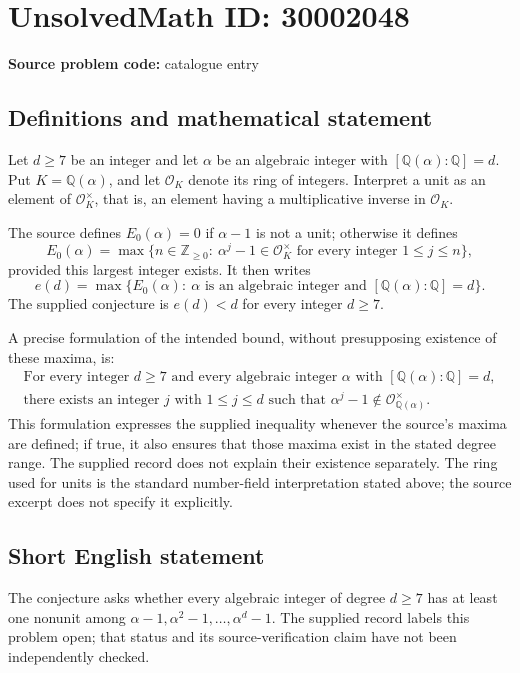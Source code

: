 \documentclass[11pt]{article}
\newcommand{\Z}{\mathbb{Z}}
\newcommand{\Q}{\mathbb{Q}}
\begin{document}
\section*{UnsolvedMath ID: 30002048}
\textbf{Source problem code:} catalogue entry
\subsection{Definitions and mathematical statement}
Let \(d\geq 7\) be an integer and let \(\alpha\) be an algebraic integer with \([\Q(\alpha):\Q]=d\). Put \(K=\Q(\alpha)\), and let \(\mathcal O_K\) denote its ring of integers. Interpret a unit as an element of \(\mathcal O_K^{\times}\), that is, an element having a multiplicative inverse in \(\mathcal O_K\).

The source defines \(E_0(\alpha)=0\) if \(\alpha-1\) is not a unit; otherwise it defines
\[
E_0(\alpha)=\max\bigl\{n\in\Z_{\geq 0}:\ \alpha^j-1\in\mathcal O_K^{\times}\text{ for every integer }1\leq j\leq n\bigr\},
\]
provided this largest integer exists. It then writes
\[
e(d)=\max\bigl\{E_0(\alpha):\ \alpha\text{ is an algebraic integer and }[\Q(\alpha):\Q]=d\bigr\}.
\]
The supplied conjecture is \(e(d)<d\) for every integer \(d\geq 7\).

A precise formulation of the intended bound, without presupposing existence of these maxima, is:
\[
\begin{gathered}
\text{For every integer }d\geq 7\text{ and every algebraic integer }\alpha
\text{ with }[\Q(\alpha):\Q]=d,\\
\text{there exists an integer }j\text{ with }1\leq j\leq d
\text{ such that }\alpha^j-1\notin\mathcal O_{\Q(\alpha)}^{\times}.
\end{gathered}
\]
This formulation expresses the supplied inequality whenever the source's maxima are defined; if true, it also ensures that those maxima exist in the stated degree range. The supplied record does not explain their existence separately. The ring used for units is the standard number-field interpretation stated above; the source excerpt does not specify it explicitly.
\subsection{Short English statement}
The conjecture asks whether every algebraic integer of degree \(d\geq 7\) has at least one nonunit among \(\alpha-1,\alpha^2-1,\ldots,\alpha^d-1\). The supplied record labels this problem open; that status and its source-verification claim have not been independently checked.
\end{document}
